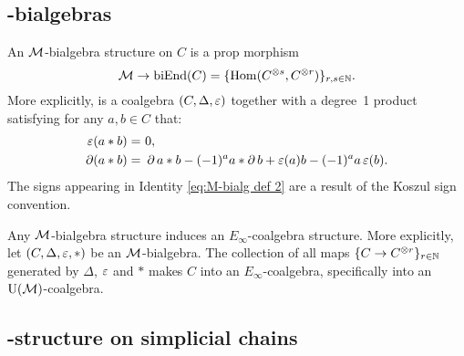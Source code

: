 \subsection{\pdfM-bialgebras}


An $\mathcal{M}$-bialgebra structure on $C$ is a prop morphism
\[
\mathcal{M} \to \mathrm{biEnd}(C) = \{\mathrm{Hom}(C^{\otimes s}, C^{\otimes r})\}_{r,s\in\mathbb{N}}.
\]
More explicitly, is a coalgebra $(C, \Delta, \operatorname{\varepsilon})$ together with a degree~1 product satisfying for any $a,b \in C$ that:
\begin{align}
	\label{eq:M-bialg def 1}
	\operatorname{\varepsilon}(a \ast b) =\ & 0, \\
	\label{eq:M-bialg def 2}
	\operatorname{\partial} (a \ast b) =\ & \operatorname{\partial} a \ast b - (-1)^{a} a \ast \operatorname{\partial} b + \operatorname{\varepsilon}(a) b - (-1)^{a} a \operatorname{\varepsilon}(b).
\end{align}
The signs appearing in Identity \eqref{eq:M-bialg def 2} are a result of the Koszul sign convention.

Any $\mathcal{M}$-bialgebra structure induces an $E_\infty$-coalgebra structure.
More explicitly, let $(C, \Delta, \operatorname{\varepsilon}, \ast)$ be an $\mathcal{M}$-bialgebra.
The collection of all maps $\{C \to C^{\otimes r}\}_{r \in \mathbb{N}}$ generated by $\Delta$, $\operatorname{\varepsilon}$ and $\ast$ makes $C$ into an $E_\infty$-coalgebra, specifically into an ${\operatorname{U}(\mathcal{M})}$-coalgebra.

\subsection{\pdfEinfty-structure on simplicial chains}

